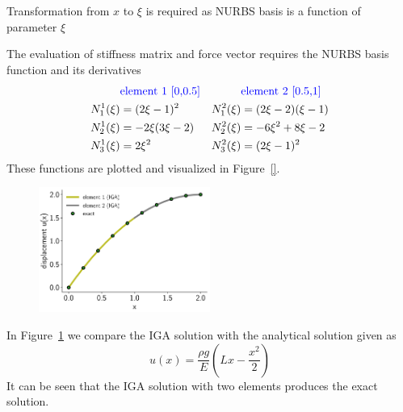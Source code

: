 \documentclass[submit,12pt]{aiaa-pretty} %
\begin{document}
Transformation from $x$ to $\xi$ is required as NURBS basis is a
function of parameter $\xi$


The evaluation of stiffness matrix and force vector requires the NURBS
basis function and its derivatives
\begin{equation}\label{eqn:bar-nurbs-derivatives}
  \begin{aligned}
    & \textcolor{blue}{\text{element 1 [0,0.5]}}  & & \textcolor{blue}{\text{element 2 [0.5,1]}} \\
    N_1^1(\xi) &=  (2 \xi -1)^2 & N_1^2(\xi) &= (2\xi-2)(\xi-1)  \\
    N_2^1(\xi) &= -2\xi(3\xi-2) &N_2^2(\xi) &= -6\xi^2 + 8\xi -2 \\
    N_3^1(\xi) &=  2\xi^2       & N_3^2(\xi) &= (2\xi -1)^2 \\
  \end{aligned}
\end{equation}
These functions are plotted and visualized in Figure~\ref{}.
\begin{figure}\label{eqn:bar-solution}
  \centering
  \includegraphics[width=0.5\textwidth]{figures/bar-solution.pdf} \\
\end{figure}
In Figure~\ref{eqn:bar-solution} we compare the IGA solution with the analytical solution given as
\begin{equation}\nonumber
  u(x) = \frac{\rho g}{E} \left( Lx - \frac{x^2}{2}\right)
\end{equation}
It can be seen that the IGA solution with two elements produces the
exact solution.
\end{document}
